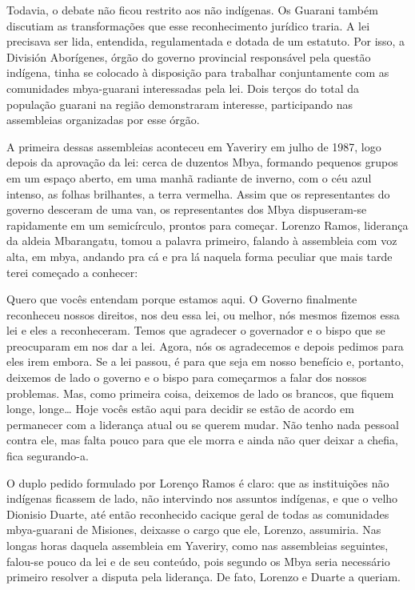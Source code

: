 {{Todavia, o debate não ficou restrito aos não indígenas. Os Guarani
também discutiam as transformações que esse reconhecimento jurídico
traria. A lei precisava ser lida, entendida, regulamentada e dotada de
um estatuto. Por isso, a División Aborígenes, órgão do governo
provincial responsável pela questão indígena, tinha se colocado à
disposição para trabalhar conjuntamente com as comunidades mbya-guarani
interessadas pela lei. Dois terços do total da população guarani na
região demonstraram interesse, participando nas assembleias organizadas
por esse órgão. 

A primeira dessas assembleias aconteceu em Yaveriry em julho de 1987,
logo depois da aprovação da lei: cerca de duzentos Mbya, formando
pequenos grupos em um espaço aberto, em uma manhã radiante de inverno,
com o céu azul intenso, as folhas brilhantes, a terra vermelha. Assim
que os representantes do governo desceram de uma van, os representantes
dos Mbya dispuseram-se rapidamente em um semicírculo, prontos para
começar. Lorenzo Ramos, liderança da aldeia Mbarangatu, tomou a palavra
primeiro, falando à assembleia com voz alta, em mbya, andando pra cá e
pra lá naquela forma peculiar que mais tarde terei começado a conhecer:

Quero que vocês entendam porque estamos aqui. O Governo finalmente
reconheceu nossos direitos, nos deu essa lei, ou melhor, nós mesmos
fizemos essa lei e eles a reconheceram. Temos que agradecer o
governador e o bispo que se preocuparam em nos dar a lei. Agora, nós os
agradecemos e depois pedimos para eles irem embora. Se a lei passou, é
para que seja em nosso benefício e, portanto, deixemos de lado o
governo e o bispo para começarmos a falar dos nossos problemas. Mas,
como primeira coisa, deixemos de lado os brancos, que fiquem longe,
longe\ldots{} Hoje vocês estão aqui para decidir se estão de acordo em
permanecer com a liderança atual ou se querem mudar. Não tenho nada
pessoal contra ele, mas falta pouco para que ele morra e ainda não quer
deixar a chefia, fica segurando-a.

O duplo pedido formulado por Lorenço Ramos é claro: que as instituições
não indígenas ficassem de lado, não intervindo nos assuntos indígenas,
e que o velho Dionisio Duarte, até então reconhecido cacique geral de
todas as comunidades mbya-guarani de Misiones, deixasse o cargo que
ele, Lorenzo, assumiria. Nas longas horas daquela assembleia em
Yaveriry, como nas assembleias seguintes, falou-se pouco da lei e de
seu conteúdo, pois segundo os Mbya seria necessário primeiro resolver a
disputa pela liderança. De fato, Lorenzo e Duarte a queriam.

}}
